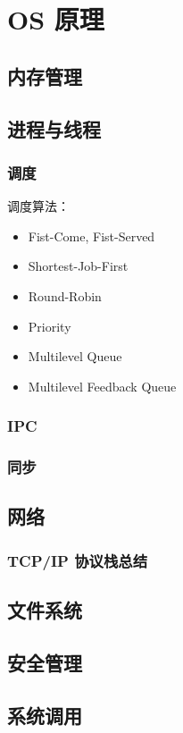 \section{OS 原理}

\subsection{内存管理}

\subsection{进程与线程}

\subsubsection{调度}

调度算法：
\begin{itemize}
  \item Fist-Come, Fist-Served
  \item Shortest-Job-First
  \item Round-Robin
  \item Priority
  \item Multilevel Queue
  \item Multilevel Feedback Queue
\end{itemize}

\subsubsection{IPC}

\subsubsection{同步}

\subsection{网络}
\subsubsection{TCP/IP 协议栈总结}

\subsection{文件系统}

\subsection{安全管理}

\subsection{系统调用}
